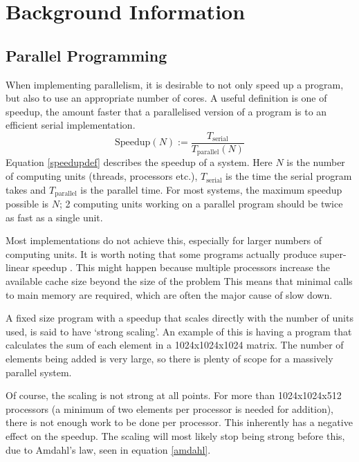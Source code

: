 \documentclass[../main.tex]{subfiles}
\begin{document}
  \section{Background Information}
    \subsection{Parallel Programming}
    When implementing parallelism, it is desirable to not only speed up a program, but also to use an appropriate number of cores.
    A useful definition is one of speedup, the amount faster that a parallelised version of a program is to an efficient serial implementation.
    \begin{equation}
      \text{Speedup}(N) := \frac{T_\text{serial}}{T_\text{parallel}(N)}
      \label{speedupdef}
    \end{equation}
    Equation \ref{speedupdef} describes the speedup of a system.
    Here $N$ is the number of computing units (threads, processors etc.), $T_\text{serial}$ is the time the serial program takes and $T_\text{parallel}$ is the parallel time.
    For most systems, the maximum speedup possible is $N$; 2 computing units working on a parallel program should be twice as fast as a single unit. 

    Most implementations do not achieve this, especially for larger numbers of computing units.
    It is worth noting that some programs actually produce super-linear speedup \cite{superlinear}.
    This might happen because multiple processors increase the available cache size beyond the size of the problem
    This means that minimal calls to main memory are required, which are often the major cause of slow down.

    A fixed size program with a speedup that scales directly with the number of units used, is said to have `strong scaling'.
    An example of this is having a program that calculates the sum of each element in a 1024x1024x1024 matrix.
    The number of elements being added is very large, so there is plenty of scope for a massively parallel system.

    Of course, the scaling is not strong at all points.
    For more than 1024x1024x512 processors (a minimum of two elements per processor is needed for addition), there is not enough work to be done per processor.
    This inherently has a negative effect on the speedup.
    The scaling will most likely stop being strong before this, due to Amdahl's law, seen in equation \ref{amdahl}.
\end{document}
